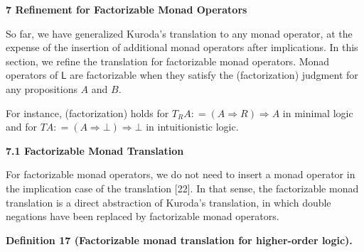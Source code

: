 \documentclass[10pt,a4paper]{article}
\begin{document}
\par\medskip\noindent\textbf{7 Refinement for Factorizable Monad Operators}\par
 
 
So far, we have generalized Kuroda’s translation to any monad operator, at the expense of the insertion of additional monad operators after implications. In this section, we refine the translation for factorizable monad operators. Monad operators of $\mathsf{L}$ are factorizable when they satisfy the (factorization) judgment for any propositions $A$ and $B$.\par
 
\begin{center}\end{center}
 
For instance, (factorization) holds for $T_{R}A\mathrel{\mathop{:}}=(A\mathbin{\Rightarrow}R)\mathbin{\Rightarrow}A$ in minimal logic and for $TA\mathrel{\mathop{:}}=(A\mathbin{\Rightarrow}\bot)\mathbin{\Rightarrow}\bot$ in intuitionistic logic.\par
 
 
 
\par\medskip\noindent\textbf{7.1 Factorizable Monad Translation}\par
 
 
For factorizable monad operators, we do not need to insert a monad operator in the implication case of the translation [22]. In that sense, the factorizable monad translation is a direct abstraction of Kuroda’s translation, in which double negations have been replaced by factorizable monad operators.\par
 
 
 
\par\medskip\noindent\textbf{Definition 17 (Factorizable monad translation for higher-order logic).}\par
 
 
\end{document}
